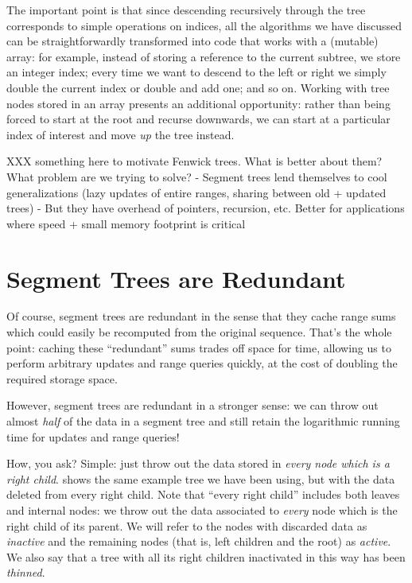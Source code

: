 \documentclass{jfp}
\providecommand{\pref}{}
\renewcommand{\pref}[1]{\prettyref{#1}}
\theoremstyle{definition}
\theoremstyle{remark}
\begin{document}
The important point is that since descending recursively through the
tree corresponds to simple operations on indices, all the algorithms
we have discussed can be straightforwardly transformed into
code that works with a (mutable) array: for example, instead of storing
a reference to the current subtree, we store an integer index; every
time we want to descend to the left or right we simply double the
current index or double and add one; and so on.  Working with tree
nodes stored in an array presents an additional opportunity: rather
than being forced to start at the root and recurse downwards, we can
start at a particular index of interest and move \emph{up} the tree
instead.

XXX something here to motivate Fenwick trees.  What is better about
them?  What problem are we trying to solve?
- Segment trees lend themselves to cool generalizations (lazy updates
  of entire ranges, sharing between old + updated trees)
- But they have overhead of pointers, recursion, etc.  Better for applications where speed + small memory footprint is critical

\section{Segment Trees are Redundant}
\label{sec:redundant}

Of course, segment trees are redundant in the sense that they
cache range sums which could easily be recomputed from the original
sequence.  That's the whole point: caching these ``redundant'' sums
trades off space for time, allowing us to perform arbitrary updates
and range queries quickly, at the cost of doubling the required
storage space.

However, segment trees are redundant in a stronger sense: we can throw
out almost \emph{half} of the data in a segment tree and still retain
the logarithmic running time for updates and range queries!

How, you ask?  Simple: just throw out the data stored in \emph{every
  node which is a right child}. \pref{fig:deactivate-right} shows the
same example tree we have been using, but with the data deleted from
every right child.  Note that ``every right child'' includes both
leaves and internal nodes: we throw out the data associated to
\emph{every} node which is the right child of its parent.  We will refer
to the nodes with discarded data as \emph{inactive} and the remaining
nodes (that is, left children and the root) as \emph{active}.  We also
say that a tree with all its right children inactivated in this way
has been \emph{thinned}.
\end{document}
